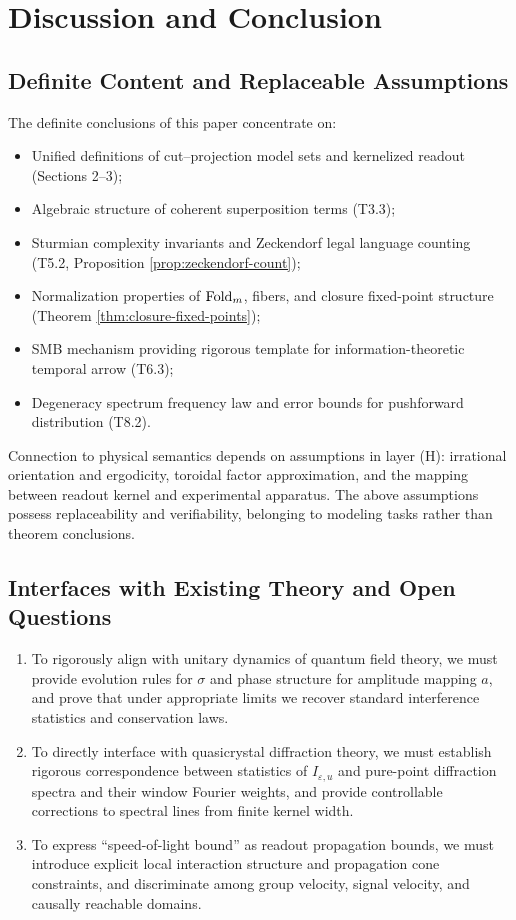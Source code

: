 \section{Discussion and Conclusion}

\subsection{Definite Content and Replaceable Assumptions}

The definite conclusions of this paper concentrate on:
\begin{itemize}
  \item Unified definitions of cut--projection model sets and kernelized readout (Sections 2--3);
  \item Algebraic structure of coherent superposition terms (T3.3);
  \item Sturmian complexity invariants and Zeckendorf legal language counting (T5.2, Proposition \ref{prop:zeckendorf-count});
  \item Normalization properties of $\mathrm{Fold}_m$, fibers, and closure fixed-point structure (Theorem \ref{thm:closure-fixed-points});
  \item SMB mechanism providing rigorous template for information-theoretic temporal arrow (T6.3);
  \item Degeneracy spectrum frequency law and error bounds for pushforward distribution (T8.2).
\end{itemize}

Connection to physical semantics depends on assumptions in layer (H): irrational orientation and ergodicity, toroidal factor approximation, and the mapping between readout kernel and experimental apparatus. The above assumptions possess replaceability and verifiability, belonging to modeling tasks rather than theorem conclusions.

\subsection{Interfaces with Existing Theory and Open Questions}

\begin{enumerate}
  \item To rigorously align with unitary dynamics of quantum field theory, we must provide evolution rules for $\sigma$ and phase structure for amplitude mapping $a$, and prove that under appropriate limits we recover standard interference statistics and conservation laws.
  \item To directly interface with quasicrystal diffraction theory, we must establish rigorous correspondence between statistics of $I_{\varepsilon,u}$ and pure-point diffraction spectra and their window Fourier weights, and provide controllable corrections to spectral lines from finite kernel width.
  \item To express ``speed-of-light bound'' as readout propagation bounds, we must introduce explicit local interaction structure and propagation cone constraints, and discriminate among group velocity, signal velocity, and causally reachable domains.
\end{enumerate}

